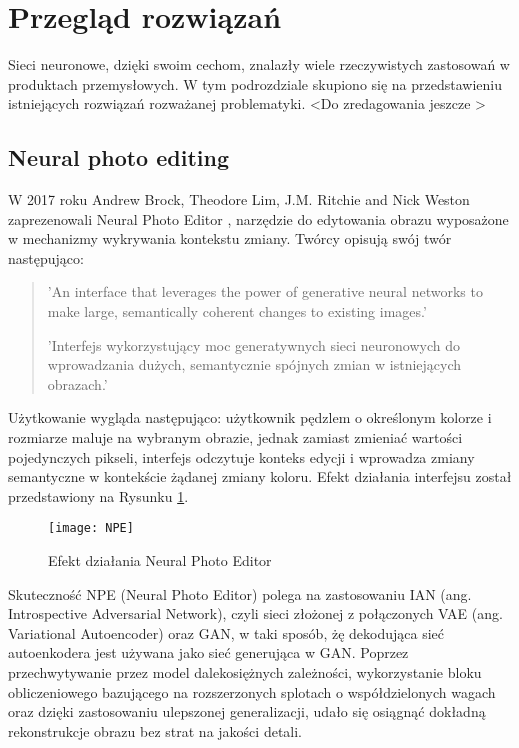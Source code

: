 \section{Przegląd rozwiązań}
  Sieci neuronowe, dzięki swoim cechom, znalazły wiele rzeczywistych zastosowań w produktach
  przemysłowych. W tym podrozdziale skupiono się na przedstawieniu istniejących
  rozwiązań rozważanej problematyki. \textless Do zredagowania jeszcze \textgreater

  \subsection{Neural photo editing}
    W 2017 roku Andrew Brock, Theodore Lim, J.M. Ritchie and Nick Weston
    zaprezenowali Neural Photo Editor \cite{neural_photo_editor}, narzędzie
    do edytowania obrazu wyposażone w mechanizmy wykrywania kontekstu zmiany.
    Twórcy opisują swój twór następująco:

    \begin{quote}
      'An interface that leverages the power of generative neural networks to
      make large, semantically coherent changes to existing images.'

      'Interfejs wykorzystujący moc generatywnych sieci neuronowych do
      wprowadzania dużych, semantycznie spójnych zmian w istniejących obrazach.'
    \end{quote}

    Użytkowanie wygląda następująco: użytkownik pędzlem o określonym kolorze i
    rozmiarze maluje na wybranym obrazie, jednak zamiast zmieniać wartości
    pojedynczych pikseli, interfejs odczytuje konteks edycji i wprowadza zmiany
    semantyczne w kontekście żądanej zmiany koloru. Efekt działania interfejsu
    został przedstawiony na Rysunku \ref{fig:npe}.

    \begin{figure}[h]
      \centering
      \texttt{[image: NPE]}
      \caption{Efekt działania Neural Photo Editor}
      \label{fig:npe}
    \end{figure}

    Skuteczność NPE (Neural Photo Editor) polega na zastosowaniu IAN
    (ang. Introspective Adversarial Network), czyli sieci złożonej z połączonych
    VAE (ang. Variational Autoencoder) oraz GAN, w taki sposób, żę dekodująca
    sieć autoenkodera jest używana jako sieć generująca w GAN.
    Poprzez przechwytywanie przez model dalekosiężnych zależności, wykorzystanie
    bloku obliczeniowego bazującego na rozszerzonych splotach o
    współdzielonych wagach oraz dzięki zastosowaniu ulepszonej generalizacji,
    udało się osiągnąć dokładną rekonstrukcje obrazu bez strat na jakości detali.


